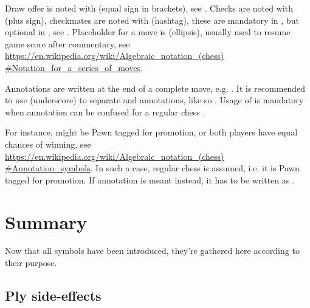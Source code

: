 Draw offer is noted with \alg{(=)} (equal sign in brackets), see . Checks are noted with \alg{+} (plus sign),
checkmates are noted with \alg{\#} (hashtag), these are mandatory in , but optional in , see
. Placeholder for a move is  (ellipsis), usually used to resume game score after commentary, see\\
\href{https://en.wikipedia.org/wiki/Algebraic\_notation\_(chess)\#Notation\_for\_a\_series\_of\_moves}{https://en.wikipedia.org/wiki/Algebraic\_notation\_(chess)\\
\#Notation\_for\_a\_series\_of\_moves}.

Annotations are written at the end of a complete move, e.g. . It is recommended to use \alg{\_} (underscore)
to separate  and annotations, like so . Usage of \alg{\_} is mandatory when annotation can be
confused for a regular chess .

For instance,  might be Pawn tagged for promotion, or both players have equal chances of winning, see\\
\href{https://en.wikipedia.org/wiki/Algebraic\_notation\_(chess)#Annotation\_symbols}{https://en.wikipedia.org/wiki/Algebraic\_notation\_(chess)\\
\#Annotation\_symbols}. In such a case, regular chess  is assumed, i.e. it is Pawn tagged for promotion.
If annotation is meant instead, it has to be written as .

\clearpage %

\section*{Summary}
\label{sec:Appendix/Summary}

Now that all symbols have been introduced, they're gathered here according to their purpose.

\subsection*{Ply side-effects}
\label{sec:Appendix/Summary/Ply side-effects}

